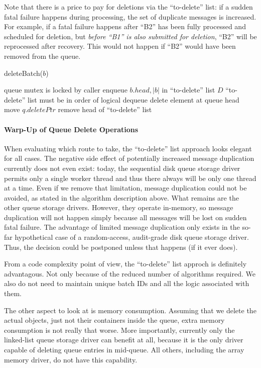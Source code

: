 \documentclass[a4paper,10pt]{article}
\begin{document}
Note that there is a price to pay for deletions via the ``to-delete'' list: if a sudden fatal failure happens during processing, the set of duplicate messages is increased. For example, if a fatal failure happens after ``B2'' has been fully processed and scheduled for deletion, but \emph{before ``B1'' is also submitted for deletion}, ``B2'' will be reprocessed after recovery. This would not happen if ``B2'' would have been removed from the queue.

\begin{algorithm}
\caption{deleteBatch($b$)}
\begin{algorithmic}
\label{alg_phys_deq_seq_store}
\REQUIRE queue mutex is locked by caller
\STATE enqueue $b.head, |b|$ in ``to-delete'' list $D$
\COMMENT ``to-delete'' list must be in order of logical dequeue
		\STATE delete element at queue head
		\STATE move $q.deletePtr$
	\ENDFOR
	\STATE remove head of ``to-delete'' list
\ENDWHILE 
\end{algorithmic}
\end{algorithm}

\paragraph{Warp-Up of Queue Delete Operations}
When evaluating which route to take, the ``to-delete'' list approach looks elegant for all cases. The negative side effect of potentially increased message duplication currently does not even exist: today, the sequential disk queue storage driver permits only a single worker thread and thus there always will be only one thread at a time. Even if we remove that limitation, message duplication could not be avoided, as stated in the algorithm description above. What remains are the other queue storage drivers. However, they operate in-memory, so message duplication will not happen simply because all messages will be lost on sudden fatal failure. The advantage of limited message duplication only exists in the so-far hypothetical case of a random-access, audit-grade disk queue storage driver. Thus, the decision could be postponed unless that happens (if it ever does).

From a code complexity point of view, the ``to-delete'' list approch is definitely advantagous. Not only because of the reduced number of algorithms required. We also do not need to maintain unique batch IDs and all the logic associated with them.

The other aspect to look at is memory consumption. Assuming that we delete the actual objects, just not their containers inside the queue, extra memory consumption is not really that worse. More importantly, currently only the linked-list queue storage driver can benefit at all, because it is the only driver capable of deleting queue entries in mid-queue. All others, including the array memory driver, do not have this capability.
\end{document}
